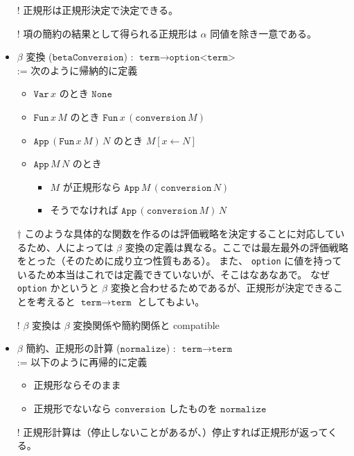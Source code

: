 \documentclass[dvipdfmx]{jsarticle}
\begin{document}
\begin{itemize}
  \item[!] 正規形は正規形決定で決定できる。
  \item[!] 項の簡約の結果として得られる正規形は \(\alpha\) 同値を除き一意である。
  \item \(\beta\) 変換 (\(\texttt{betaConversion}\)) : \(\texttt{term} \to \texttt{option<term>}\) \\
    := 次のように帰納的に定義
    \begin{itemize}
      \item \(\texttt{Var} \, x\) のとき \(\texttt{None}\)
      \item \(\texttt{Fun} \, x \, M\) のとき \(\texttt{Fun} \, x \, (\texttt{conversion} \, M)\)
      \item \(\texttt{App} \, (\texttt{Fun} \, x \, M) \, N\) のとき \(M[x \leftarrow N]\)
      \item \(\texttt{App} \, M \, N\) のとき
        \begin{itemize}
          \item \(M\) が正規形なら \(\texttt{App} \, M \, (\texttt{conversion} \, N)\)
          \item そうでなければ \(\texttt{App} \, (\texttt{conversion} \, M) \, N\)
        \end{itemize}
    \end{itemize}
  \item[\(\dagger\)] このような具体的な関数を作るのは評価戦略を決定することに対応しているため、人によっては \(\beta\) 変換の定義は異なる。ここでは最左最外の評価戦略をとった（そのために成り立つ性質もある）。
  また、 \texttt{option} に値を持っているため本当はこれでは定義できていないが、そこはなあなあで。
  なぜ \texttt{option} かというと \(\beta\) 変換と合わせるためであるが、正規形が決定できることを考えると \(\texttt{term} \to \texttt{term}\) としてもよい。
  \item[!] \(\beta\) 変換は \(\beta\) 変換関係や簡約関係と compatible
  \item \(\beta\) 簡約、正規形の計算 (\(\texttt{normalize}\)) : \(\texttt{term} \to \texttt{term}\) \\
    := 以下のように再帰的に定義
      \begin{itemize}
        \item 正規形ならそのまま
        \item 正規形でないなら \(\texttt{conversion}\) したものを \(\texttt{normalize}\)
      \end{itemize}
  \item[!] 正規形計算は（停止しないことがあるが、）停止すれば正規形が返ってくる。

\end{itemize}
\end{document}

